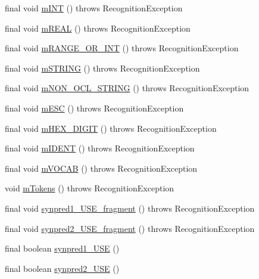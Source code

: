 \begin{DoxyCompactItemize}
final void \hyperlink{classorg_1_1tzi_1_1use_1_1parser_1_1use_1_1_u_s_e_lexer_a2e69b559f07a9f06dc7e6b2bc1a9f86b}{m\-I\-N\-T} ()  throws Recognition\-Exception 
\item 
final void \hyperlink{classorg_1_1tzi_1_1use_1_1parser_1_1use_1_1_u_s_e_lexer_a5d82bb15b05666e99fca426db68d74c3}{m\-R\-E\-A\-L} ()  throws Recognition\-Exception 
\item 
final void \hyperlink{classorg_1_1tzi_1_1use_1_1parser_1_1use_1_1_u_s_e_lexer_a962ee32adc0b8293e63f83d0752684de}{m\-R\-A\-N\-G\-E\-\_\-\-O\-R\-\_\-\-I\-N\-T} ()  throws Recognition\-Exception 
\item 
final void \hyperlink{classorg_1_1tzi_1_1use_1_1parser_1_1use_1_1_u_s_e_lexer_a1fe8322cd81976c727a31e6060ab4196}{m\-S\-T\-R\-I\-N\-G} ()  throws Recognition\-Exception 
\item 
final void \hyperlink{classorg_1_1tzi_1_1use_1_1parser_1_1use_1_1_u_s_e_lexer_a509ae48a8c5c5e520364198feacb6cd7}{m\-N\-O\-N\-\_\-\-O\-C\-L\-\_\-\-S\-T\-R\-I\-N\-G} ()  throws Recognition\-Exception 
\item 
final void \hyperlink{classorg_1_1tzi_1_1use_1_1parser_1_1use_1_1_u_s_e_lexer_a8f5c15191c9925af1a3678535de6c6f8}{m\-E\-S\-C} ()  throws Recognition\-Exception 
\item 
final void \hyperlink{classorg_1_1tzi_1_1use_1_1parser_1_1use_1_1_u_s_e_lexer_aaf85ce09541e74bb74c5e7255226fd43}{m\-H\-E\-X\-\_\-\-D\-I\-G\-I\-T} ()  throws Recognition\-Exception 
\item 
final void \hyperlink{classorg_1_1tzi_1_1use_1_1parser_1_1use_1_1_u_s_e_lexer_a4ff5993c33c9680bfc6e36eca0fd2d4b}{m\-I\-D\-E\-N\-T} ()  throws Recognition\-Exception 
\item 
final void \hyperlink{classorg_1_1tzi_1_1use_1_1parser_1_1use_1_1_u_s_e_lexer_a20743d0c5eed8855752007f5226f368f}{m\-V\-O\-C\-A\-B} ()  throws Recognition\-Exception 
\item 
void \hyperlink{classorg_1_1tzi_1_1use_1_1parser_1_1use_1_1_u_s_e_lexer_af2505c0c8aa3610b7b87b3c2e09e4ca0}{m\-Tokens} ()  throws Recognition\-Exception 
\item 
final void \hyperlink{classorg_1_1tzi_1_1use_1_1parser_1_1use_1_1_u_s_e_lexer_af8687fa1af9c1423d5963f3aad27ff49}{synpred1\-\_\-\-U\-S\-E\-\_\-fragment} ()  throws Recognition\-Exception 
\item 
final void \hyperlink{classorg_1_1tzi_1_1use_1_1parser_1_1use_1_1_u_s_e_lexer_a2c0c6b33140ded1ebc029db091dfbd18}{synpred2\-\_\-\-U\-S\-E\-\_\-fragment} ()  throws Recognition\-Exception 
\item 
final boolean \hyperlink{classorg_1_1tzi_1_1use_1_1parser_1_1use_1_1_u_s_e_lexer_ade9af1fae56936ff05ac8a739f6e31ef}{synpred1\-\_\-\-U\-S\-E} ()
\item 
final boolean \hyperlink{classorg_1_1tzi_1_1use_1_1parser_1_1use_1_1_u_s_e_lexer_a2592df0b9af08fbc238307b4242fce68}{synpred2\-\_\-\-U\-S\-E} ()
\end{DoxyCompactItemize}

